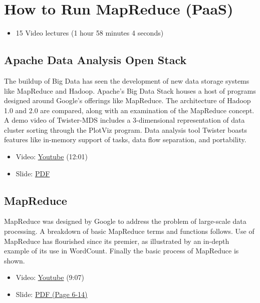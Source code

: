 \section{How to Run MapReduce (PaaS)}\label{how-to-run-mapreduce-paas}

\begin{itemize}
\tightlist
\item
  15 Video lectures (1 hour 58 minutes 4 seconds)
\end{itemize}

\subsection{Apache Data Analysis Open
Stack}\label{apache-data-analysis-open-stack}

The buildup of Big Data has seen the development of new data storage
systems like MapReduce and Hadoop. Apache's Big Data Stack houses a host
of programs designed around Google's offerings like MapReduce. The
architecture of Hadoop 1.0 and 2.0 are compared, along with an
examination of the MapReduce concept. A demo video of Twister-MDS
includes a 3-dimensional representation of data cluster sorting through
the PlotViz program. Data analysis tool Twister boasts features like
in-memory support of tasks, data flow separation, and portability.

\begin{itemize}
\tightlist
\item
  Video: \href{https://www.youtube.com/watch?v=6vkgvGtyv4Q}{Youtube}
  (12:01)
\end{itemize}

\begin{itemize}
\tightlist
\item
  Slide:
  \href{https://drive.google.com/open?id=0B88HKpainTSfMnpCelpNQUpNdVE}{PDF}
\end{itemize}

\subsection{MapReduce}\label{mapreduce}

MapReduce was designed by Google to address the problem of large-scale
data processing. A breakdown of basic MapReduce terms and functions
follows. Use of MapReduce has flourished since its premier, as
illustrated by an in-depth example of its use in WordCount. Finally the
basic process of MapReduce is shown.

\begin{itemize}
\tightlist
\item
  Video: \href{https://www.youtube.com/watch?v=sSIGaDaulvA}{Youtube}
  (9:07)
\item
  Slide:
  \href{https://drive.google.com/open?id=0B88HKpainTSfMnpCelpNQUpNdVE}{PDF
  (Page 6-14)}
\end{itemize}

